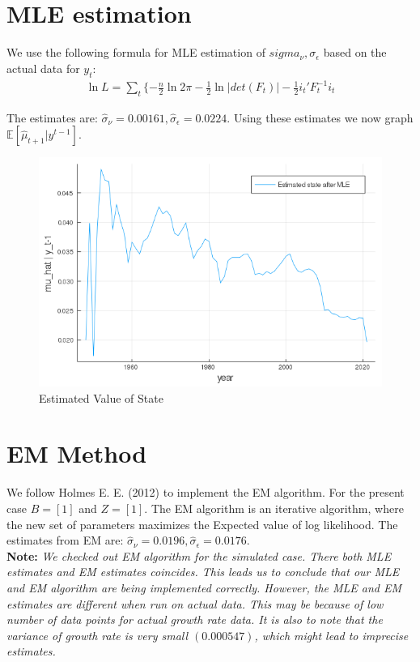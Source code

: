 \documentclass[12pt]{article}
\begin{document}
\newpage

\section{MLE estimation}
We use the following formula for MLE estimation of $sigma_{\nu}, \sigma_{\epsilon}$ based on the actual data for $y_t$:
\begin{align*}
\ln L = \sum_t \{ -\frac{n}{2} \ln 2\pi -\frac{1}{2}\ln |det(F_t)| - \frac{1}{2}i_t'F_t^{-1}i_t 
\end{align*}

The estimates are: $\hat{\sigma}_{\nu} = 0.00161 , \hat{\sigma}_{\epsilon} =  0.0224$. Using these estimates we now graph $\mathbb{E}[\hat{\mu}_{t+1}|y^{t-1}]$.
\begin{figure}[h]
\centering
\includegraphics[scale=0.5]{3_b.png}
\caption{Estimated Value of State}
\end{figure}


\section{EM Method}
We follow Holmes E. E. (2012) to implement the EM algorithm.
For the present case $B = [1]$ and $Z = [1]$. The EM algorithm is an iterative algorithm, where the new set of parameters maximizes the Expected value of log likelihood. The estimates from EM are: $\hat{\sigma}_{\nu} = 0.0196, \hat{\sigma}_{\epsilon} = 0.0176$. \\

\textbf{Note:} \textit{We checked out EM algorithm for the simulated case. There both MLE estimates and EM estimates coincides. This leads us to conclude that our MLE and EM algorithm are being implemented correctly. However, the MLE and EM estimates are different when run on actual data. This may be because of low number of data points for actual growth rate data. It is also to note that the variance of growth rate is very small $(0.000547)$, which might lead to imprecise estimates.}
\end{document}
